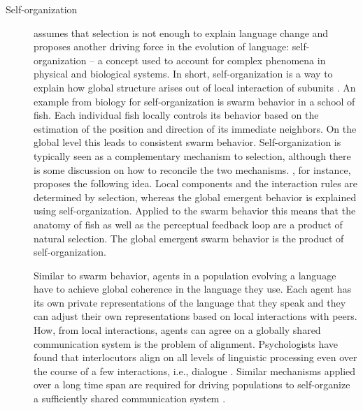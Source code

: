 \begin{description}
\item[Self-organization]
\cite{steels2011self-organization}  assumes that selection is not enough to explain 
language change and proposes another driving force in the evolution of language: 
self-organization -- a concept used to account for complex 
phenomena in physical and biological systems. In short, self-organization is a way to explain 
how global structure arises out of local interaction of subunits \citep{camazine2003self}. 
An example from biology for self-organization is swarm behavior in a school of fish. 
Each individual fish locally controls its behavior based on the estimation of the 
position and direction of its immediate neighbors. On the global level this leads to 
consistent swarm behavior. Self-organization is typically seen as a complementary 
mechanism to selection, although there is some discussion 
on how to reconcile the two mechanisms. 
\cite{kauffman1993origins}, for instance, proposes the following idea. 
Local components and the interaction rules are determined by selection, whereas the global emergent behavior is explained using self-organization. 
Applied to the swarm behavior this means that the anatomy of fish as 
well as the perceptual feedback loop are a product of natural selection. 
The global emergent swarm behavior is the product of self-organization. 

Similar to swarm behavior, agents in a population evolving a language have
to achieve global coherence in the language they use. Each agent has its own 
private representations of the language that they speak and they can 
adjust their own representations based on local interactions with peers. 
How, from local interactions, agents can agree
on a globally shared communication system is the problem of alignment.
Psychologists have found that interlocutors align on all levels of linguistic processing
even over the course of a few interactions, i.e., dialogue
\citep{garrod1994conversation,pickering2004toward}.
Similar mechanisms applied over a long time span are required for driving populations 
to self-organize a sufficiently shared communication system 
\citep{steels2002bootstrapping}. 


\end{description}
